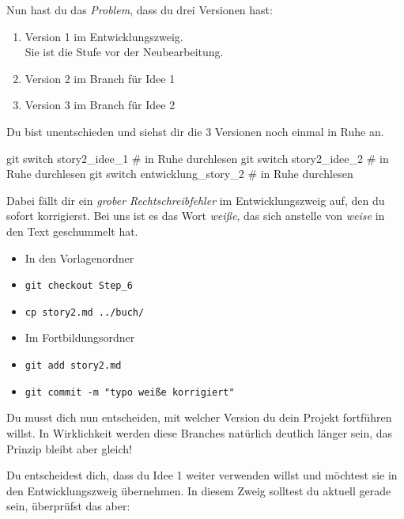 \documentclass[
  letterpaper,
  DIV=11]{scrreprt}
\newenvironment{Shaded}{\begin{snugshade}}{\end{snugshade}}
\newcommand{\CommentTok}[1]{\textcolor[rgb]{0.37,0.37,0.37}{#1}}
\newcommand{\FunctionTok}[1]{\textcolor[rgb]{0.28,0.35,0.67}{#1}}
\newcommand{\NormalTok}[1]{\textcolor[rgb]{0.00,0.23,0.31}{#1}}
\providecommand{\tightlist}{%
  \setlength{\itemsep}{0pt}\setlength{\parskip}{0pt}}\usepackage{longtable,booktabs,array}
\begin{document}
Nun hast du das \emph{Problem}, dass du drei Versionen hast:

\begin{enumerate}
\def\labelenumi{\arabic{enumi}.}
\tightlist
\item
  Version 1 im Entwicklungszweig.\\
  Sie ist die Stufe vor der Neubearbeitung.
\item
  Version 2 im Branch für Idee 1
\item
  Version 3 im Branch für Idee 2
\end{enumerate}

Du bist unentschieden und siehst dir die 3 Versionen noch einmal in Ruhe
an.

\begin{Shaded}
\begin{Highlighting}[]
\FunctionTok{git}\NormalTok{ switch story2\_idee\_1        }\CommentTok{\# in Ruhe durchlesen}
\FunctionTok{git}\NormalTok{ switch story2\_idee\_2        }\CommentTok{\# in Ruhe durchlesen }
\FunctionTok{git}\NormalTok{ switch entwicklung\_story\_2  }\CommentTok{\# in Ruhe durchlesen}
\end{Highlighting}
\end{Shaded}

Dabei fällt dir ein \emph{grober Rechtschreibfehler} im
Entwicklungszweig auf, den du sofort korrigierst. Bei uns ist es das
Wort \emph{weiße}, das sich anstelle von \emph{weise} in den Text
geschummelt hat.

\begin{itemize}
\item
  In den Vorlagenordner
\item
  \texttt{git\ checkout\ Step\_6}
\item
  \texttt{cp\ story2.md\ ../buch/}
\item
  Im Fortbildungsordner
\item
  \texttt{git\ add\ story2.md}
\item
  \texttt{git\ commit\ -m\ "typo\ \textquotesingle{}weiße\textquotesingle{}\ korrigiert"}
\end{itemize}

Du musst dich nun entscheiden, mit welcher Version du dein Projekt
fortführen willst. In Wirklichkeit werden diese Branches natürlich
deutlich länger sein, das Prinzip bleibt aber gleich!

Du entscheidest dich, dass du Idee 1 weiter verwenden willst und
möchtest sie in den Entwicklungszweig übernehmen. In diesem Zweig
solltest du aktuell gerade sein, überprüfst das aber:
\end{document}

